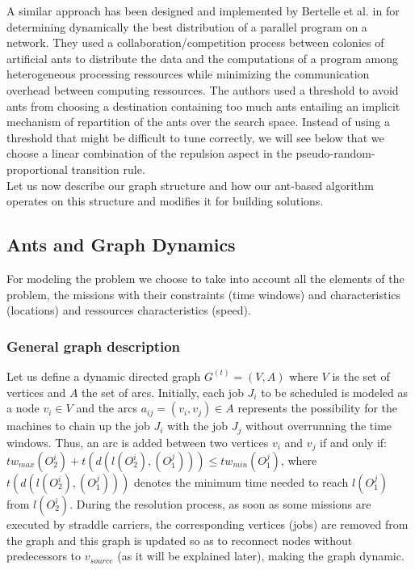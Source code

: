\documentclass[a4paper,10pt]{article}
\begin{document}
A similar approach has been designed and implemented by Bertelle et al. in \cite{Bertelle2006,Bertelle2007} for determining dynamically the best distribution of a parallel program on a network. They used a collaboration/competition process between colonies of artificial ants to distribute the data and the computations of a program among heterogeneous processing ressources while minimizing the communication overhead between computing ressources. The authors used a threshold to avoid ants from choosing a destination containing too much ants entailing an implicit mechanism of repartition of the ants over the search space. Instead of using a threshold that might be difficult to tune correctly, we will see below that we choose a linear combination of the repulsion aspect in the pseudo-random-proportional transition rule.\\

Let us now describe our graph structure and how our ant-based algorithm operates on this structure and modifies it for building solutions.

\subsection{Ants and Graph Dynamics}

For modeling the problem we choose to take into account all the elements of the problem, the missions with their constraints (time windows) and characteristics (locations) and ressources characteristics (speed).
 
\subsubsection{General graph description} 

Let us define a dynamic directed graph $G^{(t)} = (V,A)$ where $V$ is the set of vertices and $A$ the set of arcs. Initially, each job $J_i$ to be scheduled is modeled as a node $v_i \in V$ and the arcs $a_{ij} = (v_i,v_j) \in A$ represents the possibility for the machines to chain up the job $J_i$ with the job $J_j$ without overrunning the time windows. Thus, an arc is added between two vertices $v_i$ and $v_j$ if and only if:  $tw_{max}(O_2^i) + t(d(l(O_2^i),(O_1^j))) \leq tw_{min}(O_1^j)$, where $t(d(l(O_2^i),(O_1^j)))$ denotes the minimum time needed to reach $l(O_1^j)$ from $l(O_2^i)$. During the resolution process, as soon as some missions are executed by straddle carriers, the corresponding vertices (jobs) are removed from the graph and this graph is updated so as to reconnect nodes without predecessors to $v_{source}$ (as it will be explained later), making the graph dynamic.
\end{document}
